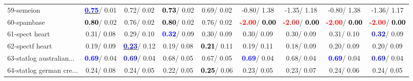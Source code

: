 \begin{table}[h]
\begin{center}
\begin{tabular}{lc|c|c|c|c|c|c|c}
59-semeion & \underline{\textcolor{blue}{\textbf{  0.75}}}/  0.01 &   0.72/  0.02 & \textcolor{black}{\textbf{  0.73}}/  0.02 &   0.69/  0.02 &  -0.80/  1.38 &  -1.35/  1.18 &  -0.80/  1.38 &  -1.36/  1.17 \\
60-spambase & \textcolor{black}{\textbf{  0.80}}/  0.02 &   0.76/  0.02 & \textcolor{black}{\textbf{  0.80}}/  0.02 &   0.76/  0.02 & \textcolor{red}{\textbf{ -2.00}}/\textcolor{black}{\textbf{  0.00}} & \textcolor{red}{\textbf{ -2.00}}/\textcolor{black}{\textbf{  0.00}} & \textcolor{red}{\textbf{ -2.00}}/\textcolor{black}{\textbf{  0.00}} & \textcolor{red}{\textbf{ -2.00}}/\textcolor{black}{\textbf{  0.00}} \\ \hline
61-spect heart &   0.31/  0.08 &   0.29/  0.10 & \textcolor{blue}{\textbf{  0.32}}/  0.09 &   0.30/  0.09 &   0.30/  0.09 &   0.30/  0.09 &   0.31/  0.10 & \textcolor{blue}{\textbf{  0.32}}/  0.09 \\
62-spectf heart &   0.19/  0.09 & \underline{\textcolor{blue}{\textbf{  0.23}}}/  0.12 &   0.19/  0.08 & \textcolor{black}{\textbf{  0.21}}/  0.11 &   0.19/  0.11 &   0.18/  0.09 &   0.20/  0.09 &   0.20/  0.09 \\
63-statlog australian... & \textcolor{blue}{\textbf{  0.69}}/  0.04 & \textcolor{blue}{\textbf{  0.69}}/  0.04 &   0.68/  0.05 &   0.67/  0.05 & \textcolor{blue}{\textbf{  0.69}}/  0.04 &   0.68/  0.04 & \textcolor{blue}{\textbf{  0.69}}/  0.04 & \textcolor{blue}{\textbf{  0.69}}/  0.04 \\
64-statlog german cre... &   0.24/  0.08 &   0.24/  0.05 &   0.22/  0.05 & \textcolor{black}{\textbf{  0.25}}/  0.06 &   0.23/  0.05 &   0.23/  0.07 &   0.24/  0.06 &   0.24/  0.05 \\\end{tabular}\label{stratsALCKappa1bRF}
\end{center}
\end{table}
